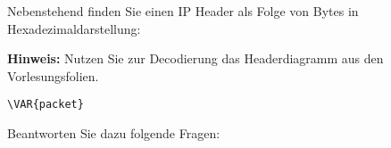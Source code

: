 \question{}

\begin{minipage}{.45\linewidth}
Nebenstehend finden Sie einen IP Header
als Folge von Bytes in Hexadezimaldarstellung:

\textbf{Hinweis:} Nutzen Sie zur Decodierung das Headerdiagramm aus den Vorlesungsfolien.
\end{minipage}
\hfill
\begin{minipage}{.45\linewidth}
\begin{verbatim}
\VAR{packet}
\end{verbatim}
\end{minipage}

Beantworten Sie dazu folgende Fragen:
\setlength\answerskip{\dimexpr-\baselineskip}
